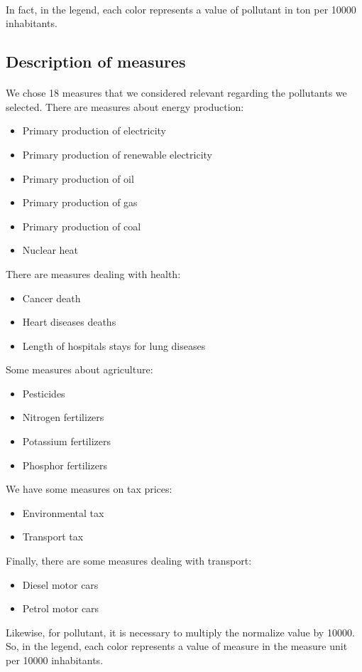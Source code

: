 \documentclass[preprint,journal]{vgtc}       %
\begin{document}
\paragraph{}
In fact, in the legend, each color represents a value of pollutant in ton per 10000 inhabitants.

\subsection{Description of measures}

\paragraph{}
We chose 18 measures that we considered relevant regarding the pollutants we selected.
\newline
There are measures about energy production:
	\begin{itemize}[parsep=0cm,itemsep=0cm]
	\item Primary production of electricity
	\item Primary production of renewable electricity
	\item Primary production of oil
	\item Primary production of gas
	\item Primary production of coal
	\item Nuclear heat
	\end{itemize}
There are measures dealing with health:
	\begin{itemize}[parsep=0cm,itemsep=0cm]
	\item Cancer death
	\item Heart diseases deaths
	\item Length of hospitals stays for lung diseases
	\end{itemize}	
Some measures about agriculture:
	\begin{itemize}[parsep=0cm,itemsep=0cm]
	\item Pesticides
	\item Nitrogen fertilizers
	\item Potassium fertilizers
	\item Phosphor fertilizers
	\end{itemize}	
We have some measures on tax prices:
	\begin{itemize}[parsep=0cm,itemsep=0cm]
	\item Environmental tax
	\item Transport tax
	\end{itemize}	
Finally, there are some measures dealing with transport:
	\begin{itemize}[parsep=0cm,itemsep=0cm]
	\item Diesel motor cars
	\item Petrol motor cars
	\end{itemize}
Likewise, for pollutant, it is necessary to multiply the normalize value by 10000. So, in the legend, each color represents a value of measure in the measure unit per 10000 inhabitants.
\end{document}
